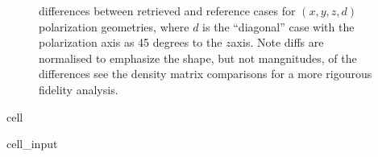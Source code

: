 \documentclass[letterpaper,table,10pt,english]{jupyterBook}
\begin{document}
\begin{figure}[htbp]
\centering
\capstart

\noindent{}
\caption{{\hyperref[\detokenize{backmatter/glossary:term-MF}]{}} differences between retrieved and reference cases for \((x,y,z,d)\) polarization geometries, where \(d\) is the “diagonal” case with the polarization axis as 45 degrees to the \(z\)\sphinxhyphen{}axis. Note diffs are normalised to emphasize the shape, but not mangnitudes, of the differences \sphinxhyphen{} see the density matrix comparisons for a more rigourous fidelity analysis.}\label{\detokenize{part2/case-study-N2_290723:fig-n2-diff}}\end{figure}

\begin{sphinxuseclass}{cell}\begin{sphinxVerbatimInput}

\begin{sphinxuseclass}{cell_input}
\begin{sphinxVerbatim}[commandchars=\\\{\}]
  
\PYG{p}{[}\PYG{p}{]} 
\end{sphinxVerbatim}

\end{sphinxuseclass}\end{sphinxVerbatimInput}

\end{sphinxuseclass}
\sphinxstepscope
\end{document}
